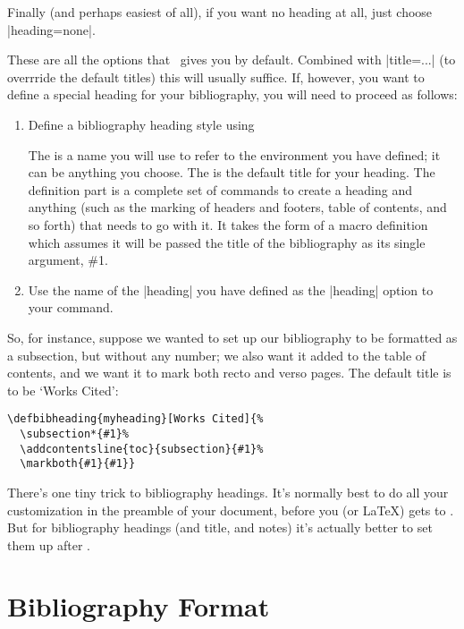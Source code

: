 Finally (and perhaps easiest of all), if you want no heading at all,
just choose |heading=none|.

These are all the options that \biblatex\ gives you by
default. Combined with |title=...| (to overrride the default titles)
this will usually suffice. If, however, you want to define a special
heading for your bibliography, you will need to proceed as
follows:
\begin{enumerate}
\item Define a bibliography heading style using
\begin{center}
\end{center}
The  is a name you will use to refer to the environment
you have defined; it can be anything you choose. The  is
the default title for your heading. The definition part is a complete
set of commands to create a heading and anything (such as the marking
of headers and footers, table of contents, and so forth) that needs to
go with it. It takes the form of a macro definition which assumes it
will be passed the title of the bibliography as its single argument,
\#1.
\item Use the name of the |heading| you have defined as the
  |heading| option to your  command.
\end{enumerate}

So, for instance, suppose we wanted to set up our bibliography to be
formatted as a subsection, but without any number; we also want it
added to the table of contents, and we want it to mark both recto and
verso pages. The default title is to be `Works Cited':
\begin{verbatim}
\defbibheading{myheading}[Works Cited]{%
  \subsection*{#1}%
  \addcontentsline{toc}{subsection}{#1}%
  \markboth{#1}{#1}}
\end{verbatim}

There's one tiny trick to bibliography headings. It's normally best to
do all your customization in the preamble of your document, before you
(or \LaTeX) gets to . But for bibliography
headings (and title, and notes) it's actually better to set them up
after .

\section{Bibliography Format}

